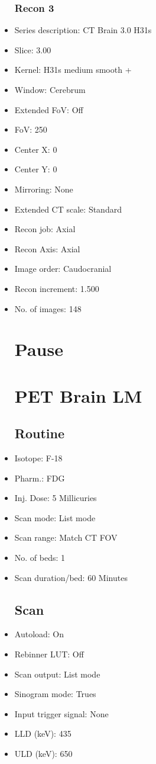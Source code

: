 \documentclass[12pt]{article}
\begin{document}
\begin{itemize}[noitemsep]
\subsubsection{Recon 3}
\item Series description: CT Brain 3.0 H31s
\item Slice: 3.00
\item Kernel: H31s medium smooth +
\item Window: Cerebrum
\item Extended FoV: Off
\item FoV: 250
\item Center X: 0
\item Center Y: 0
\item Mirroring: None
\item Extended CT scale: Standard
\item Recon job: Axial
\item Recon Axis: Axial
\item Image order: Caudocranial
\item Recon increment: 1.500
\item No. of images: 148
\section{Pause}
\section{PET Brain LM}\subsection{Routine}
\item Isotope: F-18
\item Pharm.: FDG
\item Inj. Dose: 5 Millicuries
\item Scan mode: List mode
\item Scan range: Match CT FOV
\item No. of beds: 1
\item Scan duration/bed: 60 Minutes
\subsection{Scan}
\item Autoload: On
\item Rebinner LUT: Off
\item Scan output: List mode
\item Sinogram mode: Trues
\item Input trigger signal: None
\item LLD (keV): 435
\item ULD (keV): 650

\end{itemize}
\end{document}
